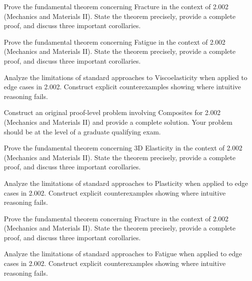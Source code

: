 \documentclass[12pt,a4paper]{exam}
\begin{document}
\begin{questions}
\vspace{0.3cm}

\question[8]
Prove the fundamental theorem concerning Fracture in the context of 2.002 (Mechanics and Materials II). State the theorem precisely, provide a complete proof, and discuss three important corollaries.

\vspace{0.3cm}

\question[4]
Prove the fundamental theorem concerning Fatigue in the context of 2.002 (Mechanics and Materials II). State the theorem precisely, provide a complete proof, and discuss three important corollaries.

\vspace{0.3cm}

\question[2]
Analyze the limitations of standard approaches to Viscoelasticity when applied to edge cases in 2.002. Construct explicit counterexamples showing where intuitive reasoning fails.

\vspace{0.3cm}

\question[4]
Construct an original proof-level problem involving Composites for 2.002 (Mechanics and Materials II) and provide a complete solution. Your problem should be at the level of a graduate qualifying exam.

\vspace{0.3cm}

\question[3]
Prove the fundamental theorem concerning 3D Elasticity in the context of 2.002 (Mechanics and Materials II). State the theorem precisely, provide a complete proof, and discuss three important corollaries.

\vspace{0.3cm}

\question[5]
Analyze the limitations of standard approaches to Plasticity when applied to edge cases in 2.002. Construct explicit counterexamples showing where intuitive reasoning fails.

\vspace{0.3cm}

\question[2]
Prove the fundamental theorem concerning Fracture in the context of 2.002 (Mechanics and Materials II). State the theorem precisely, provide a complete proof, and discuss three important corollaries.

\vspace{0.3cm}

\question[4]
Analyze the limitations of standard approaches to Fatigue when applied to edge cases in 2.002. Construct explicit counterexamples showing where intuitive reasoning fails.


\end{questions}
\end{document}
